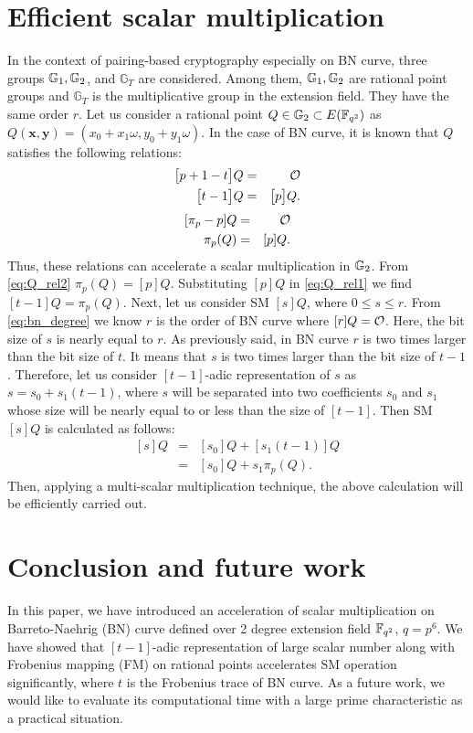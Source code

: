 \section{Efficient scalar multiplication}
In the context of pairing-based cryptography especially on BN curve, three groups ${\mathbb{G}}_{1}, {\mathbb{G}}_{2}$, and $\mathbb{G}_T$ are considered. Among them, ${\mathbb{G}}_{1}, {\mathbb{G}}_{2}$ are rational point groups and $\mathbb{G}_T$ is the multiplicative group in the extension field. They have the same order $r$. Let us consider a rational point $Q\in {\mathbb{G}}_{2} \subset E({\mathbb{F}}_{q^{2}})$ as $Q(\textbf{x},\textbf{y}) =(x_0+x_1\omega, y_0+y_1\omega)$. In the case of BN curve, it is known that $Q$ satisfies the following relations:
\begin{eqnarray}\label{eq:Q_rel1}
\big[p+1-t\big]Q & = & \cal O \nonumber \\
\big[t-1\big]Q  & = & \big[p\big]Q.
\end{eqnarray}
\begin{eqnarray}\label{eq:Q_rel2}
[\pi_p -p]Q & = &\cal O \nonumber \\
\pi_p(Q) & = & [p]Q.
\end{eqnarray}
Thus, these relations can accelerate a scalar multiplication in ${\mathbb{G}}_{2}$. From \eqref{eq:Q_rel2} $\pi_p(Q)= [p]Q$. Substituting $[p]Q$ in \eqref{eq:Q_rel1} we find $[t-1]Q = \pi_p(Q)$. 
Next, let us consider SM $[s]Q$, where $0 \leq s \leq r$. From \eqref{eq:bn_degree} we know $r$ is the order of BN curve  where $[r]Q=\cal O$. Here, the bit size of $s$ is nearly equal to $r$. As previously said, in BN curve $r$ is two times larger than the bit size of $t$. It means that $s$ is two times larger than the bit size of $t-1$. Therefore, let us consider $[t-1]$-adic representation of $s$ as $s = s_0+s_1(t-1)$, where $s$ will be separated into two coefficients $s_0$ and $s_1$ whose size will be nearly equal to or less than the size of $[t-1]$. Then SM  $[s]Q$ is calculated as follows:
\begin{eqnarray}\label{eq:scalar_mul_Q}
[s]Q & =  & [s_0]Q+[s_1(t-1)]Q \nonumber \\
& =  & [s_0]Q+s_1\pi_p(Q).
\end{eqnarray}
Then, applying a multi-scalar multiplication technique, the above calculation will be efficiently carried out.

\section{Conclusion and future work}
In this paper, we have introduced an acceleration of scalar multiplication on Barreto-Naehrig (BN) curve defined over 2 degree extension field ${\mathbb{F}}_{q^{2}}$, $q=p^6$. We have showed that $[t-1]$-adic representation of large scalar number along with Frobenius mapping (FM) on rational points accelerates SM operation significantly, where $t$ is the Frobenius trace of BN curve. As a future work, we would like to evaluate its computational time with a large prime characteristic as a practical situation.


